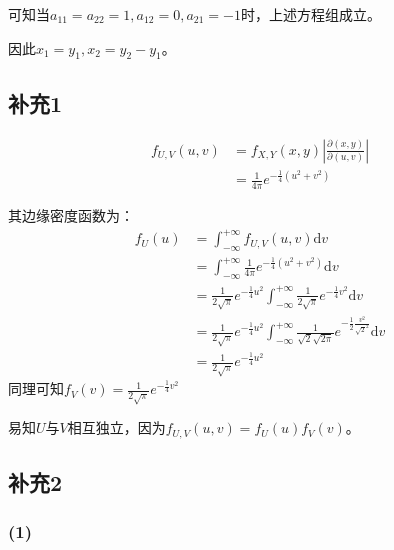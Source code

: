 \documentclass[a4paper,12pt]{ctexart}
\begin{document}
可知当$a_{11} = a_{22} = 1, a_{12} = 0, a_{21} = -1$时，上述方程组成立。

因此$x_1 = y_1, x_2 = y_2 - y_1$。

\subsection*{补充1}

\begin{align*}
	f_{U,V}(u,v) &= f_{X,Y}(x,y) \left| \frac{\partial(x,y)}{\partial(u,v)} \right| \\
	&= \frac{1}{4\pi} e^{-\frac{1}{4} (u^2 + v^2)} 
\end{align*}

其边缘密度函数为：
\begin{align*}
	f_U(u) &= \int_{-\infty}^{+\infty} f_{U,V}(u,v) \mathrm{d} v \\
	&= \int_{-\infty}^{+\infty} \frac{1}{4\pi} e^{-\frac{1}{4} (u^2 + v^2)} \mathrm{d} v \\
	&= \frac{1}{2\sqrt{\pi}} e^{-\frac{1}{4} u^2} \int_{-\infty}^{+\infty} \frac{1}{2\sqrt{\pi}} e^{-\frac{1}{4} v^2} \mathrm{d} v \\
	&= \frac{1}{2\sqrt{\pi}} e^{-\frac{1}{4} u^2} \int_{-\infty}^{+\infty} \frac{1}{\sqrt{2}\sqrt{2\pi}} e^{-\frac{1}{2} \frac{v^2}{\sqrt{2}^2}} \mathrm{d} v \\
	&= \frac{1}{2\sqrt{\pi}} e^{-\frac{1}{4} u^2} 
\end{align*}
同理可知$f_V(v) = \frac{1}{2\sqrt{\pi}} e^{-\frac{1}{4} v^2}$

易知$U$与$V$相互独立，因为$f_{U,V}(u,v) = f_U(u)f_V(v)$。

\subsection*{补充2}

\subsubsection*{(1)}
\end{document}
